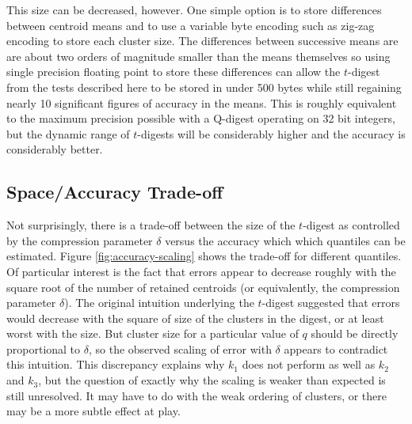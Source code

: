 \documentclass[11pt]{amsart}
\begin{document}
This size can be decreased, however.  One simple option is to store differences between centroid means and to use a variable byte encoding such as zig-zag encoding to store each cluster size.  The differences between successive means are are about two orders of magnitude smaller than the means themselves so using single precision floating point to store these differences can allow the $t$-digest from the tests described here to be stored in under 500 bytes while still regaining nearly 10 significant figures of accuracy in the means.  This is roughly equivalent to the maximum precision possible with a Q-digest operating on 32 bit integers, but the dynamic range of $t$-digests will be considerably higher and the accuracy is considerably better.

\subsection{Space/Accuracy Trade-off}
Not surprisingly, there is a trade-off between the size of the $t$-digest as controlled by the compression parameter $\delta$ versus the accuracy which which quantiles can be estimated.  Figure \ref{fig:accuracy-scaling} shows the trade-off for different quantiles. Of particular interest is the fact that errors appear to decrease roughly with the  square root of the number of retained centroids (or equivalently, the compression parameter $\delta$). The original intuition underlying the $t$-digest suggested that errors would decrease with the square of size of the clusters in the digest, or at least worst with the size. But cluster size for a particular value of $q$ should be directly proportional to $\delta$, so the observed scaling of error with $\delta$ appears to contradict this intuition. This discrepancy explains why $k_1$ does not perform as well as $k_2$ and $k_3$, but the question of exactly why the scaling is weaker than expected is still unresolved. It may have to do with the weak ordering of clusters, or there may be a more subtle effect at play. 
\end{document}

